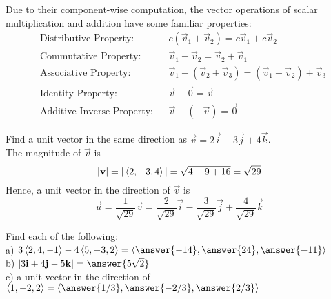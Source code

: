 \documentclass[handout]{ximera}
\begin{document}
Due to their component-wise computation, the vector operations of scalar multiplication and addition have some familiar properties:
\begin{align*}
&\text{Distributive Property:} & &c(\vec{v}_1 + \vec{v}_2) = c\vec{v}_1 + c\vec{v}_2   \\
& \text{Commutative Property:}& &\vec{v}_1 + \vec{v}_2 = \vec{v}_2 + \vec{v}_1 \\
& \text{Associative Property:}&  &\vec{v}_1 + (\vec{v}_2+ \vec{v}_3) =  (\vec{v}_1 + \vec{v}_2) + \vec{v}_3 \\
&\text{Identity Property:} & &\vec{v} + \vec{0} = \vec{v} \\
& \text{Additive Inverse Property:} & &\vec{v} + (-\vec{v}) = \vec{0} 
\end{align*}

\begin{example}
Find a unit vector in the same direction as $\vec{v} = 2 \vec{i} - 3\vec{j} + 4\vec{k}$.\\
The magnitude of $\vec{v}$ is
\[
|\mathbf{v}| = |\left\langle 2, -3, 4\right\rangle| = \sqrt{4+9+16} = \sqrt{29}
\]
Hence, a unit vector in the direction of $\vec{v}$ is
\[
\vec{u} = \frac{1}{\sqrt{29}}\vec{v} = \frac{2}{\sqrt{29}}\vec{i} - \frac{3}{\sqrt{29}}\vec{j} + \frac{4}{\sqrt{29}}\vec{k}
\]
\end{example}

\begin{problem}
Find each of the following:\\
a) $3\vector{2, 4, -1} - 4\vector{5, -3, 2} = \vector{\answer{-14}, \answer{24}, \answer{-11}}$\\
b) $|3\vec{i} + 4\vec{j}- 5\vec{k}| = \answer{5\sqrt{2}}$\\
c) a unit vector in the direction of $\vector{1, -2, 2} = \vector{\answer{1/3}, \answer{-2/3}, \answer{2/3}}$
\end{problem}
\end{document}
